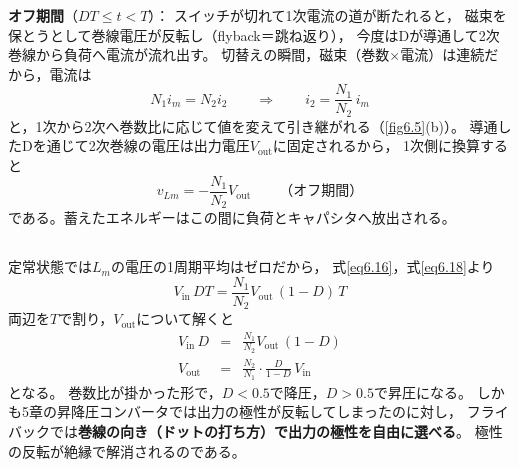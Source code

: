 \textbf{オフ期間}（$DT \le t < T$）：
スイッチが切れて1次電流の道が断たれると，
磁束を保とうとして巻線電圧が反転し（flyback＝跳ね返り），
今度は$\mathrm{D}$が導通して2次巻線から負荷へ電流が流れ出す。
切替えの瞬間，磁束（巻数$\times$電流）は連続だから，電流は
\begin{equation}
N_1 i_m = N_2 i_2
\qquad\Rightarrow\qquad
i_2 = \frac{N_1}{N_2}\,i_m
\label{eq6.17}
\end{equation}
と，1次から2次へ巻数比に応じて値を変えて引き継がれる（\ref{fig6.5}(b)）。
導通した$\mathrm{D}$を通じて2次巻線の電圧は出力電圧$V_{\mathrm{out}}$に固定されるから，
1次側に換算すると
\begin{equation}
v_{Lm} = -\frac{N_1}{N_2}V_{\mathrm{out}} \qquad （オフ期間）
\label{eq6.18}
\end{equation}
である。蓄えたエネルギーはこの間に負荷とキャパシタへ放出される。

\subsection{}

定常状態では$L_m$の電圧の1周期平均はゼロだから，
式\ref{eq6.16}，式\ref{eq6.18}より
\begin{equation}
V_{\mathrm{in}}\,DT = \frac{N_1}{N_2}V_{\mathrm{out}}\,(1-D)\,T
\label{eq6.19}
\end{equation}
両辺を$T$で割り，$V_{\mathrm{out}}$について解くと
\begin{eqnarray}
V_{\mathrm{in}}\,D &=& \frac{N_1}{N_2}V_{\mathrm{out}}\,(1-D) \nonumber\\
V_{\mathrm{out}} &=& \frac{N_2}{N_1}\cdot\frac{D}{1-D}\,V_{\mathrm{in}}
\label{eq6.20}
\end{eqnarray}
となる。
巻数比が掛かった形で，$D < 0.5$で降圧，$D > 0.5$で昇圧になる。
しかも5章の昇降圧コンバータでは出力の極性が反転してしまったのに対し，
フライバックでは\textbf{巻線の向き（ドットの打ち方）で出力の極性を自由に選べる}。
極性の反転が絶縁で解消されるのである。


